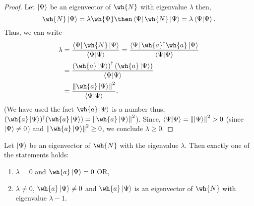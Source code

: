 \documentclass[12pt, a4paper]{article}
\begin{document}
\begin{proof}
    Let \(\ket{\Psi}\) be an eigenvector of \(\wh{N}\) with eigenvalue \(\lambda\) then,
    \[\wh{N} \ket{\Psi} = \lambda \wh{\Psi} \then \bra{\Psi} \wh{N}\ket{\Psi} = \lambda \bra{\Psi}\ket{\Psi}.\]
    Thus, we can write 
    \[\begin{aligned}
        \lambda &= \frac{\bra{\Psi}\wh{N}\ket{\Psi}}{\bra{\Psi}\ket{\Psi}} = \frac{\bra{\Psi}\wh{a}^{\dagger} \wh{a}\ket{\Psi}}{\bra{\Psi}\ket{\Psi}} \\
        &= \frac{\left( \wh{a} \ket{\Psi}\right)^{\dagger} \left( \wh{a}\ket{\Psi} \right)}{\bra{\Psi}\ket{\Psi}} \\
        &= \frac{\norm{ \wh{a} \ket{\Psi}}^2}{\bra{\Psi} \ket{\Psi}}.
    \end{aligned}\]
    (We have used the fact \(\wh{a}\ket{\Psi}\) is a number thus, \((\wh{a}\ket{\Psi})^{\dagger} (\wh{a}\ket{\Psi})= \norm{\wh{a}\ket{\Psi}}^2\)). Since, \(\bra{\Psi}\ket{\Psi} = \norm{\ket{\Psi}}^2 >0\) (since \(\ket{\Psi}\neq 0\)) and \(\norm{\wh{a}\ket{\Psi}}^2\geq 0\), we conclude \(\lambda \geq 0\).
\end{proof}

\begin{mdlemma}
    Let \(\ket{\Psi}\) be an eigenvector of \(\wh{N}\) with the eigenvalue \(\lambda\). Then exactly one of the statements holds:
    \begin{enumerate}
        \item \(\lambda=0\) \underline{and} \(\wh{a} \ket{\Psi}=0\) OR, 
        \item \(\lambda \neq 0\), \(\wh{a} \ket{\Psi} \neq 0\) and \(\wh{a} \ket{\Psi}\) is an eigenvector of \(\wh{N}\) with eigenvalue \(\lambda-1\).
    \end{enumerate}
\end{mdlemma}
\end{document}

